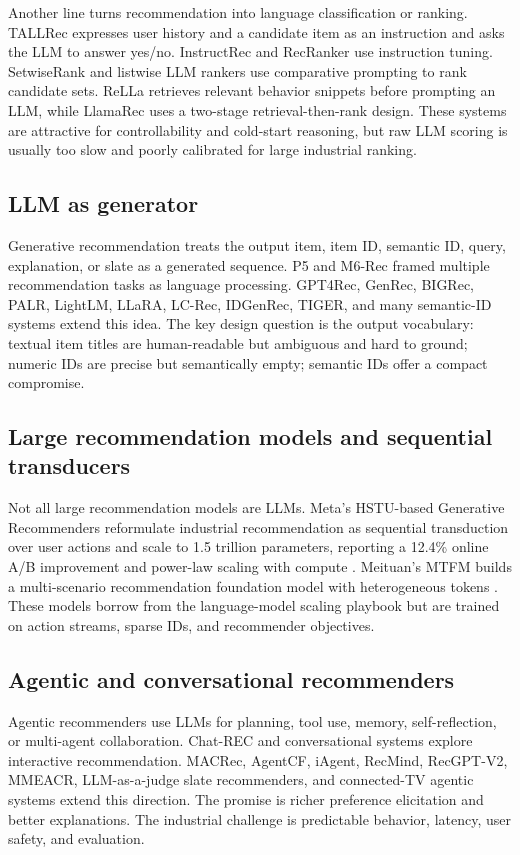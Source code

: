 \documentclass[11pt]{article}
\begin{document}
Another line turns recommendation into language classification or ranking. TALLRec expresses user history and a candidate item as an instruction and asks the LLM to answer yes/no. InstructRec and RecRanker use instruction tuning. SetwiseRank and listwise LLM rankers use comparative prompting to rank candidate sets. ReLLa retrieves relevant behavior snippets before prompting an LLM, while LlamaRec uses a two-stage retrieval-then-rank design. These systems are attractive for controllability and cold-start reasoning, but raw LLM scoring is usually too slow and poorly calibrated for large industrial ranking.

\subsection{LLM as generator}

Generative recommendation treats the output item, item ID, semantic ID, query, explanation, or slate as a generated sequence. P5 and M6-Rec framed multiple recommendation tasks as language processing. GPT4Rec, GenRec, BIGRec, PALR, LightLM, LLaRA, LC-Rec, IDGenRec, TIGER, and many semantic-ID systems extend this idea. The key design question is the output vocabulary: textual item titles are human-readable but ambiguous and hard to ground; numeric IDs are precise but semantically empty; semantic IDs offer a compact compromise.

\subsection{Large recommendation models and sequential transducers}

Not all large recommendation models are LLMs. Meta's HSTU-based Generative Recommenders reformulate industrial recommendation as sequential transduction over user actions and scale to 1.5 trillion parameters, reporting a 12.4\% online A/B improvement and power-law scaling with compute \cite{hstu}. Meituan's MTFM builds a multi-scenario recommendation foundation model with heterogeneous tokens \cite{mtfm}. These models borrow from the language-model scaling playbook but are trained on action streams, sparse IDs, and recommender objectives.

\subsection{Agentic and conversational recommenders}

Agentic recommenders use LLMs for planning, tool use, memory, self-reflection, or multi-agent collaboration. Chat-REC and conversational systems explore interactive recommendation. MACRec, AgentCF, iAgent, RecMind, RecGPT-V2, MMEACR, LLM-as-a-judge slate recommenders, and connected-TV agentic systems extend this direction. The promise is richer preference elicitation and better explanations. The industrial challenge is predictable behavior, latency, user safety, and evaluation.
\end{document}
